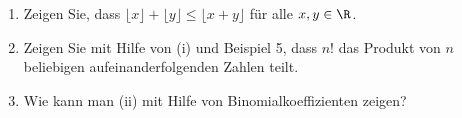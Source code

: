 
\begin{exercise}

\phantom{}

\begin{enumerate}[label = (\alph*)]
    \item Zeigen Sie, dass $\lfloor x \rfloor + \lfloor y \rfloor \leq \lfloor x + y \rfloor$
    für alle $x,y \in \R$.
    \item Zeigen Sie mit Hilfe von (i) und Beispiel 5, dass $n!$ das Produkt von $n$
    beliebigen aufeinanderfolgenden Zahlen teilt.
    \item Wie kann man (ii) mit Hilfe von Binomialkoeffizienten zeigen?
\end{enumerate}

\end{exercise}


